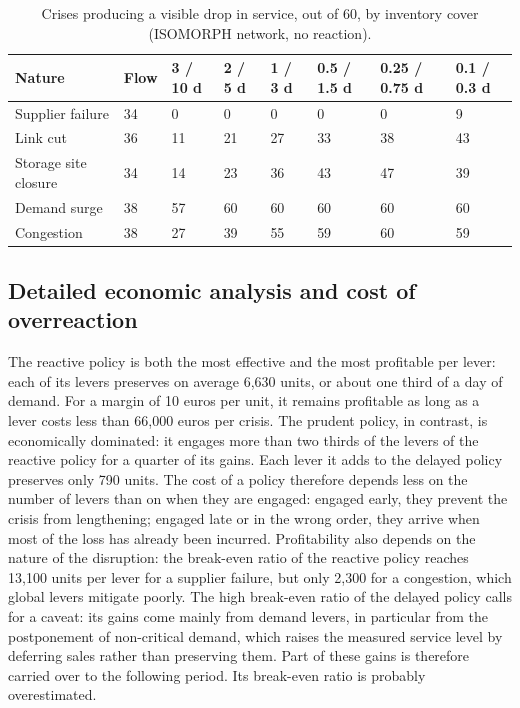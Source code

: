 \begin{table}[htbp]
\caption{Crises producing a visible drop in service, out of 60, by inventory cover (ISOMORPH network, no reaction).}
\label{tab:S4}
\footnotesize
\begin{tabularx}{\textwidth}{@{}LLLLLLLL@{}}
\toprule
\textbf{Nature} & \textbf{Flow} & \textbf{3 / 10 d} & \textbf{2 / 5 d} & \textbf{1 / 3 d} & \textbf{0.5 / 1.5 d} & \textbf{0.25 / 0.75 d} & \textbf{0.1 / 0.3 d} \\
\midrule
Supplier failure & 34 & 0 & 0 & 0 & 0 & 0 & 9 \\
Link cut & 36 & 11 & 21 & 27 & 33 & 38 & 43 \\
Storage site closure & 34 & 14 & 23 & 36 & 43 & 47 & 39 \\
Demand surge & 38 & 57 & 60 & 60 & 60 & 60 & 60 \\
Congestion & 38 & 27 & 39 & 55 & 59 & 60 & 59 \\
\bottomrule
\end{tabularx}
\end{table}

\subsection{Detailed economic analysis and cost of overreaction}
\label{sec:S6.5}

The reactive policy is both the most effective and the most profitable per lever: each of its levers preserves on average 6,630 units, or about one third of a day of demand. For a margin of 10 euros per unit, it remains profitable as long as a lever costs less than 66,000 euros per crisis. The prudent policy, in contrast, is economically dominated: it engages more than two thirds of the levers of the reactive policy for a quarter of its gains. Each lever it adds to the delayed policy preserves only 790 units. The cost of a policy therefore depends less on the number of levers than on when they are engaged: engaged early, they prevent the crisis from lengthening; engaged late or in the wrong order, they arrive when most of the loss has already been incurred. Profitability also depends on the nature of the disruption: the break-even ratio of the reactive policy reaches 13,100 units per lever for a supplier failure, but only 2,300 for a congestion, which global levers mitigate poorly. The high break-even ratio of the delayed policy calls for a caveat: its gains come mainly from demand levers, in particular from the postponement of non-critical demand, which raises the measured service level by deferring sales rather than preserving them. Part of these gains is therefore carried over to the following period. Its break-even ratio is probably overestimated.

